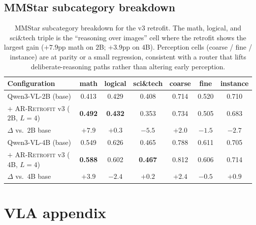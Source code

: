 \documentclass{article}
\newcommand{\retrofit}{\textsc{AR-Retrofit}}
\begin{document}
\subsection{MMStar subcategory breakdown}
\label{app:mmstar_subcat}
\begin{table}[h]
\caption{MMStar subcategory breakdown for the v3 retrofit. The math, logical, and sci\&tech triple is the ``reasoning over images'' cell where the retrofit shows the largest gain ($+7.9$pp math on $2$B; $+3.9$pp on $4$B). Perception cells (coarse / fine / instance) are at parity or a small regression, consistent with a router that lifts deliberate-reasoning paths rather than altering early perception.}
\label{tab:mmstar_subcat}
\centering\small
\setlength{\tabcolsep}{4pt}
\begin{tabular}{lcccccc}
\toprule
Configuration & math & logical & sci\&tech & coarse & fine & instance \\
\midrule
Qwen3-VL-2B (base)                       & 0.413 & 0.429 & 0.408 & 0.714 & 0.520 & 0.710 \\
$+$ \retrofit{} v3 ($2$B, $L{=}4$)       & \textbf{0.492} & \textbf{0.432} & 0.353 & 0.734 & 0.505 & 0.683 \\
$\Delta$ vs.\ $2$B base                   & $\mathbf{+7.9}$ & $+0.3$ & $-5.5$ & $+2.0$ & $-1.5$ & $-2.7$ \\
\midrule
Qwen3-VL-4B (base)                       & 0.549 & 0.626 & 0.465 & 0.788 & 0.611 & 0.705 \\
$+$ \retrofit{} v3 ($4$B, $L{=}4$)       & \textbf{0.588} & 0.602 & \textbf{0.467} & 0.812 & 0.606 & 0.714 \\
$\Delta$ vs.\ $4$B base                   & $\mathbf{+3.9}$ & $-2.4$ & $+0.2$ & $+2.4$ & $-0.5$ & $+0.9$ \\
\bottomrule
\end{tabular}
\end{table}

\section{VLA appendix}
\label{app:vla_section}
\end{document}
